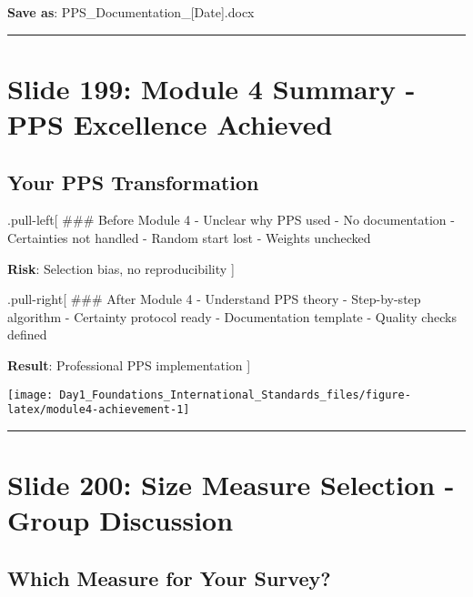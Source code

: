 \documentclass[
]{article}
\begin{document}
\textbf{Save as}: PPS\_Documentation\_{[}Date{]}.docx

\begin{center}\rule{0.5\linewidth}{0.5pt}\end{center}

\section{Slide 199: Module 4 Summary - PPS Excellence
Achieved}\label{slide-199-module-4-summary---pps-excellence-achieved}

\subsection{Your PPS Transformation}\label{your-pps-transformation}

.pull-left{[} \#\#\# Before Module 4 - Unclear why PPS used - No
documentation - Certainties not handled - Random start lost - Weights
unchecked

\textbf{Risk}: Selection bias, no reproducibility {]}

.pull-right{[} \#\#\# After Module 4 - Understand PPS theory -
Step-by-step algorithm - Certainty protocol ready - Documentation
template - Quality checks defined

\textbf{Result}: Professional PPS implementation {]}

\texttt{[image: Day1\_Foundations\_International\_Standards\_files/figure-latex/module4-achievement-1]}

\begin{center}\rule{0.5\linewidth}{0.5pt}\end{center}

\section{Slide 200: Size Measure Selection - Group
Discussion}\label{slide-200-size-measure-selection---group-discussion}

\subsection{Which Measure for Your
Survey?}\label{which-measure-for-your-survey}
\end{document}
